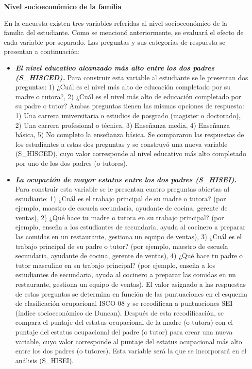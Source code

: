 \documentclass[12pt,twoside]{templates/facsothesis}
\begin{document}
\textbf{Nivel socioeconómico de la familia}

En la encuesta existen tres variables referidas al nivel socioeconómico de la familia del estudiante. Como se mencionó anteriormente, se evaluará el efecto de cada variable por separado. Las preguntas y sus categorías de respuesta se presentan a continuación:

\begin{itemize}
\item
  \textbf{\emph{El nivel educativo alcanzado más alto entre los dos padres (S\_HISCED).}} Para construir esta variable al estudiante se le presentan dos preguntas: 1) ¿Cuál es el nivel más alto de educación completado por su madre o tutora?, 2) ¿Cuál es el nivel más alto de educación completado por su padre o tutor? Ambas preguntas tienen las mismas opciones de respuesta: 1) Una carrera universitaria o estudios de posgrado (magister o doctorado), 2) Una carrera profesional o técnica, 3) Enseñanza media, 4) Enseñanza básica, 5) No completo la enseñanza básica. Se compararon las respuestas de los estudiantes a estas dos preguntas y se construyó una nueva variable (S\_HISCED), cuyo valor corresponde al nivel educativo más alto completado por uno de los dos padres (o tutores).
\item
  \textbf{\emph{La ocupación de mayor estatus entre los dos padres (S\_HISEI).}} Para construir esta variable se le presentan cuatro preguntas abiertas al estudiante: 1) ¿Cuál es el trabajo principal de su madre o tutora? (por ejemplo, maestro de escuela secundaria, ayudante de cocina, gerente de ventas), 2) ¿Qué hace tu madre o tutora en su trabajo principal? (por ejemplo, enseña a los estudiantes de secundaria, ayuda al cocinero a preparar las comidas en un restaurante, gestiona un equipo de ventas), 3) ¿Cuál es el trabajo principal de su padre o tutor? (por ejemplo, maestro de escuela secundaria, ayudante de cocina, gerente de ventas), 4) ¿Qué hace tu padre o tutor masculino en su trabajo principal? (por ejemplo, enseña a los estudiantes de secundaria, ayuda al cocinero a preparar las comidas en un restaurante, gestiona un equipo de ventas). El valor asignado a las respuestas de estas preguntas se determina en función de las puntuaciones en el esquema de clasificación ocupacional ISCO-08 y se recodifican a puntuaciones SEI (índice socioeconómico de Duncan). Después de esta recodificación, se compara el puntaje del estatus ocupacional de la madre (o tutora) con el puntaje del estatus ocupacional del padre (o tutor) para crear una nueva variable, cuyo valor corresponde al puntaje del estatus ocupacional más alto entre los dos padres (o tutores). Esta variable será la que se incorporará en el análisis (S\_HISEI).

\end{itemize}
\end{document}
